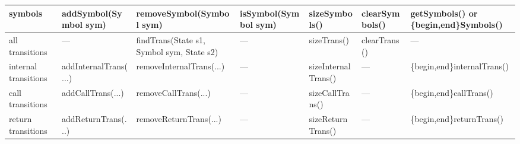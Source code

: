 \begin{sidewaystable}
\begin{threeparttable}
\begin{tabular}{p{0.75in}p{1.55in}p{1.6in}p{1.35in}p{1.27in}p{1.2in}p{1.5in}}
\hline %
symbols\tnote{2} &  addSymbol(Symbol sym)                   &  removeSymbol(Symbol sym)\tnote{5}        &  isSymbol(Symbol sym)      &  sizeSymbols()        &  clearSymbols()            &  getSymbols() or \newline
                                                                                                                                                                                             \{begin,end\}Symbols()         \\
\hline %
all \newline
transitions      &  ---                                     &  findTrans(State s1, \newline
                                                               \phantom{find}Symbol sym, State s2)&  ---                       &  sizeTrans()          &  clearTrans()              &  ---                           \\
internal \newline
transitions      &  addInternalTrans(\phantom{.}...\tnote{6}\phantom{a})
                                                            &  removeInternalTrans(\phantom{.}...\tnote{6}\phantom{a})
                                                                                                        &  ---                       &  sizeInternalTrans()  &  ---                       &  \{begin,end\}internalTrans()  \\
call \newline
transitions      &  addCallTrans(\phantom{.}...\tnote{6}\phantom{a})
                                                            &  removeCallTrans(\phantom{.}...\tnote{6}\phantom{a})
                                                                                                        &  ---                       &  sizeCallTrans()      &  ---                       &  \{begin,end\}callTrans()      \\
return \newline
transitions      &  addReturnTrans(\phantom{.}...\tnote{6}\phantom{a})
                                                            &  removeReturnTrans(\phantom{.}...\tnote{6}\phantom{a})
                                                                                                        &  ---                       &  sizeReturnTrans()  &  ---                       &  \{begin,end\}returnTrans()\\

\end{tabular}
\end{threeparttable}
\end{sidewaystable}

